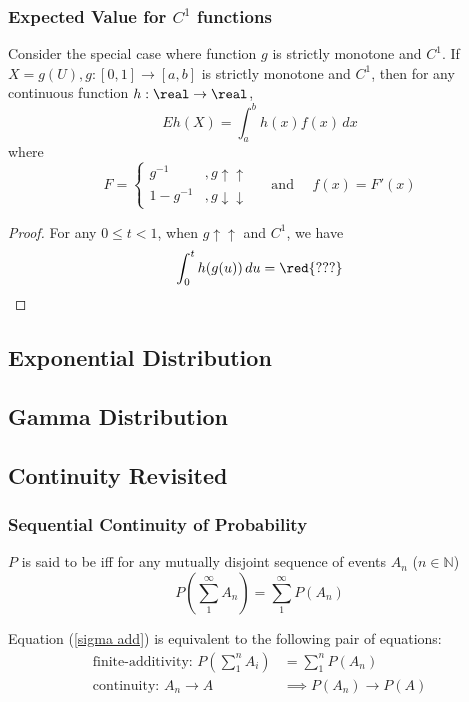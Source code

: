 \documentclass[11pt]{article}
\numberwithin{equation}{section}
\begin{document}
\subsubsection{Expected Value for $C^1$ functions}
Consider the special case where function $g$ is strictly monotone and $C^1$.
\proposition
If $X = g(U), g:[0,1] \rightarrow [a,b]$ is strictly monotone and $C^1$, then for any continuous function $h: \real \rightarrow \real$,
\begin{equation}
	Eh(X) = \int_a^b h(x)f(x) \, dx
\end{equation}
where $$F = \begin{cases}
g^{-1} &, g\uparrow\uparrow\\
1 - g^{-1} &, g\downarrow\downarrow
\end{cases} \quad \text{ and } \quad f(x) = F'(x)$$
\begin{proof}
	For any $0 \leq t < 1$, when $g \uparrow \uparrow$ and $C^1$, we have
	\begin{align*}
		\int_0^t h(g(u))\,du = \red{???}
	\end{align*}
\end{proof}
\subsection{Exponential Distribution}
\subsection{Gamma Distribution}
\subsection{Continuity Revisited}
\subsubsection{Sequential Continuity of Probability}
 $P$ is said to be  iff
for any mutually disjoint sequence of events $A_n$ ($n \in \mathbb{N}$)
\begin{equation} \label{sigma add}
	P(\sum_1^\infty A_n) = \sum_1^\infty P(A_n)
\end{equation}

\remark Equation (\ref{sigma add}) is equivalent to the following pair of equations:
\begin{align}
	\text{finite-additivity: } P(\sum_1^nA_i) &= \sum_1^n P(A_n) \\
	\text{continuity: }A_n \rightarrow A &\implies P(A_n) \rightarrow P(A)
\end{align}
\end{document}
